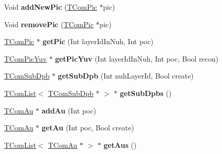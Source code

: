 \begin{DoxyCompactItemize}
\item 
\mbox{\label{class_t_com_pic_lists_a7f44fcd66d3ce37b8c73a73f65d96754}} 
Void {\bfseries add\+New\+Pic} (\hyperlink{class_t_com_pic}{T\+Com\+Pic} $\ast$pic)
\item 
\mbox{\label{class_t_com_pic_lists_addee66c735981da969cdcfceebfbe555}} 
Void {\bfseries remove\+Pic} (\hyperlink{class_t_com_pic}{T\+Com\+Pic} $\ast$pic)
\item 
\mbox{\label{class_t_com_pic_lists_a7ed2a756cbd8c03ca299c1e58cd618e5}} 
\hyperlink{class_t_com_pic}{T\+Com\+Pic} $\ast$ {\bfseries get\+Pic} (Int layer\+Id\+In\+Nuh, Int poc)
\item 
\mbox{\label{class_t_com_pic_lists_ac8dad5959d4030a98bf0722aa62a6a09}} 
\hyperlink{class_t_com_pic_yuv}{T\+Com\+Pic\+Yuv} $\ast$ {\bfseries get\+Pic\+Yuv} (Int layer\+Id\+In\+Nuh, Int poc, Bool recon)
\item 
\mbox{\label{class_t_com_pic_lists_a89f1ff3d1e3c22ad315d9f344baa6404}} 
\hyperlink{class_t_com_sub_dpb}{T\+Com\+Sub\+Dpb} $\ast$ {\bfseries get\+Sub\+Dpb} (Int nuh\+Layer\+Id, Bool create)
\item 
\mbox{\label{class_t_com_pic_lists_afc0ec3baf1dab151b31a489bb19f5ed2}} 
\hyperlink{class_t_com_list}{T\+Com\+List}$<$ \hyperlink{class_t_com_sub_dpb}{T\+Com\+Sub\+Dpb} $\ast$ $>$ $\ast$ {\bfseries get\+Sub\+Dpbs} ()
\item 
\mbox{\label{class_t_com_pic_lists_a7eeef4ff3f85d36526bbbc255e9d4a77}} 
\hyperlink{class_t_com_au}{T\+Com\+Au} $\ast$ {\bfseries add\+Au} (Int poc)
\item 
\mbox{\label{class_t_com_pic_lists_ad40b4e17f0bba6d3ec70605677f98164}} 
\hyperlink{class_t_com_au}{T\+Com\+Au} $\ast$ {\bfseries get\+Au} (Int poc, Bool create)
\item 
\mbox{\label{class_t_com_pic_lists_a5e56449e948dc171698fc13aaa080659}} 
\hyperlink{class_t_com_list}{T\+Com\+List}$<$ \hyperlink{class_t_com_au}{T\+Com\+Au} $\ast$ $>$ $\ast$ {\bfseries get\+Aus} ()

\end{DoxyCompactItemize}
